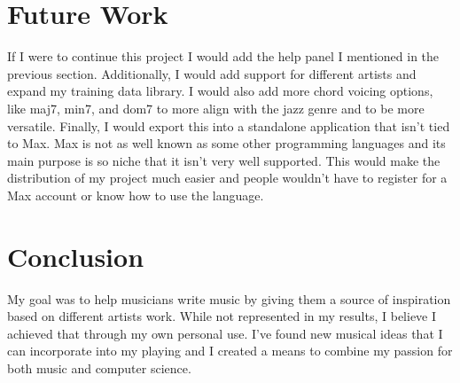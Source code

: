 \documentclass[10pt,twocolumn]{article}
\begin{document}
\section{Future Work}
    If I were to continue this project I would add the help panel I mentioned in the previous section. Additionally, I would add support for different artists and expand my training data library. I would also add more chord voicing options, like maj7, min7, and dom7 to more align with the jazz genre and to be more versatile. Finally, I would export this into a standalone application that isn't tied to Max. Max is not as well known as some other programming languages and its main purpose is so niche that it isn't very well supported. This would make the distribution of my project much easier and people wouldn't have to register for a Max account or know how to use the language. 

\section{Conclusion}
    My goal was to help musicians write music by giving them a source of inspiration based on different artists work. While not represented in my results, I believe I achieved that through my own personal use. I've found new musical ideas that I can incorporate into my playing and I created a means to combine my passion for both music and computer science.
    
\printbibliography
\end{document}
